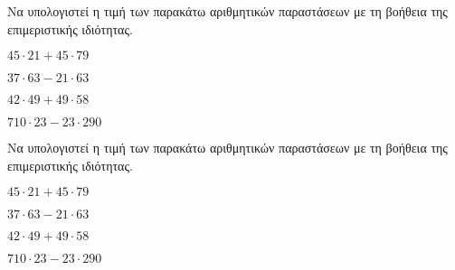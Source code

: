 Να υπολογιστεί η τιμή των παρακάτω αριθμητικών παραστάσεων με τη βοήθεια της επιμεριστικής ιδιότητας.
\begin{multicols}{2}
\begin{rlist}
\item $ 45\cdot21+45\cdot79 $
\item $ 37\cdot63-21\cdot63 $
\item $ 42\cdot49+49\cdot58 $
\item $ 710\cdot23-23\cdot290 $
\end{rlist}
\end{multicols}
Να υπολογιστεί η τιμή των παρακάτω αριθμητικών παραστάσεων με τη βοήθεια της επιμεριστικής ιδιότητας.
\begin{multicols}{2}
\begin{rlist}
\item $ 45\cdot21+45\cdot79 $
\item $ 37\cdot63-21\cdot63 $
\item $ 42\cdot49+49\cdot58 $
\item $ 710\cdot23-23\cdot290 $
\end{rlist}
\end{multicols}
